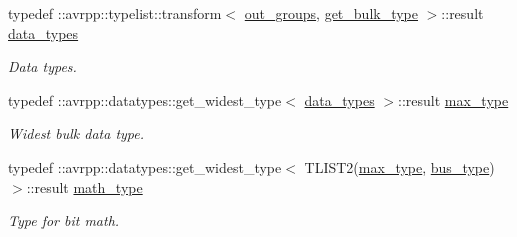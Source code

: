 \begin{DoxyCompactItemize}
typedef ::avrpp::typelist::transform$<$ \hyperlink{structavrpp_1_1bus_1_1output__bus_adcc13b4cd461b37b69491bf1ce2abeca}{out\_\-groups}, \hyperlink{structavrpp_1_1bus_1_1get__bulk__type}{get\_\-bulk\_\-type} $>$::result \hyperlink{structavrpp_1_1bus_1_1output__bus_af43086b918c5a21aa8fb7c188617fe19}{data\_\-types}
\begin{DoxyCompactList}\small\item\em Data types. \item\end{DoxyCompactList}\item 
typedef ::avrpp::datatypes::get\_\-widest\_\-type$<$ \hyperlink{structavrpp_1_1bus_1_1output__bus_af43086b918c5a21aa8fb7c188617fe19}{data\_\-types} $>$::result \hyperlink{structavrpp_1_1bus_1_1output__bus_aa104e237f02cc3070102da265320a669}{max\_\-type}
\begin{DoxyCompactList}\small\item\em Widest bulk data type. \item\end{DoxyCompactList}\item 
typedef ::avrpp::datatypes::get\_\-widest\_\-type$<$ TLIST2(\hyperlink{structavrpp_1_1bus_1_1output__bus_aa104e237f02cc3070102da265320a669}{max\_\-type}, \hyperlink{structavrpp_1_1bus_1_1output__bus_a02bf22de8447c8097a3c77e0f896a3b4}{bus\_\-type})$>$::result \hyperlink{structavrpp_1_1bus_1_1output__bus_a71d3b9043b1bce0f980fdb938872ad36}{math\_\-type}
\begin{DoxyCompactList}\small\item\em Type for bit math. \item\end{DoxyCompactList}\end{DoxyCompactItemize}
